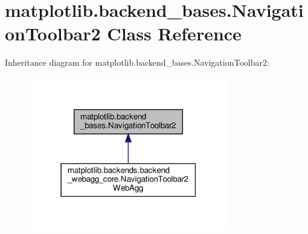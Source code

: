 \hypertarget{classmatplotlib_1_1backend__bases_1_1NavigationToolbar2}{}\section{matplotlib.\+backend\+\_\+bases.\+Navigation\+Toolbar2 Class Reference}
\label{classmatplotlib_1_1backend__bases_1_1NavigationToolbar2}


Inheritance diagram for matplotlib.\+backend\+\_\+bases.\+Navigation\+Toolbar2\+:
\nopagebreak
\begin{figure}[H]
\begin{center}
\leavevmode
\includegraphics[width=247pt]{classmatplotlib_1_1backend__bases_1_1NavigationToolbar2__inherit__graph}
\end{center}
\end{figure}
